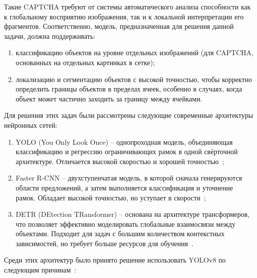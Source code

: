 Такие CAPTCHA требуют от системы автоматического анализа способности как к глобальному восприятию изображения, так и к локальной интерпретации его фрагментов. Соответственно, модель, предназначенная для решения данной задачи, должна поддерживать:

\begin{enumerate}
    \item классификацию объектов на уровне отдельных изображений (для CAPTCHA, основанных на отдельных картинках в сетке);
    \item локализацию и сегментацию объектов с высокой точностью, чтобы корректно определить границы объектов в пределах ячеек, особенно в случаях, когда объект может частично заходить за границу между ячейками.
\end{enumerate}

Для решения этих задач были рассмотрены следующие современные архитектуры нейронных сетей:

\begin{enumerate}
    \item YOLO (You Only Look Once) -- однопроходная модель, объединяющая классификацию и регрессию ограничивающих рамок в одной свёрточной архитектуре. Отличается высокой скоростью и хорошей точностью~\cite{redmon2016yolov2, UltralyticsYOLODocs};
    \item Faster R-CNN -- двухступенчатая модель, в которой сначала генерируются области предложений, а затем выполняется классификация и уточнение рамок. Обладает высокой точностью, но уступает в скорости~\cite{ren2015fasterrcnn};
    \item DETR (DEtection TRansformer) -- основана на архитектуре трансформеров, что позволяет эффективно моделировать глобальные взаимосвязи между объектами. Подходит для задач с большим количеством контекстных зависимостей, но требует больше ресурсов для обучения~\cite{carion2020detr}.
\end{enumerate}

Среди этих архитектур было принято решение использовать YOLOv8 по следующим причинам~\cite{UltralyticsYOLOv8}:

